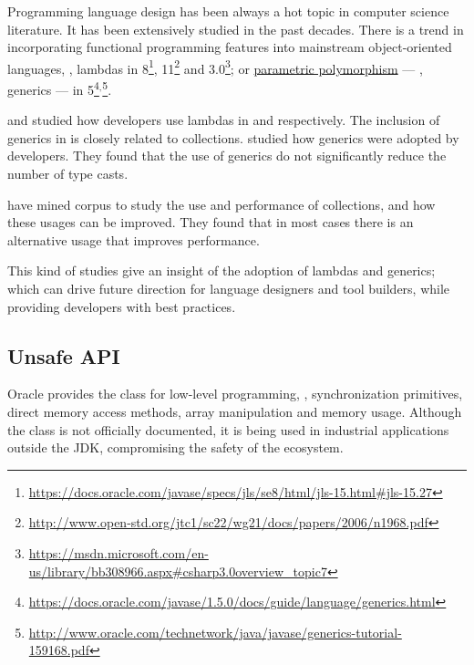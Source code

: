Programming language design has been always a hot topic in computer science literature.
It has been extensively studied in the past decades.
There is a trend in incorporating functional programming features into mainstream object-oriented languages, \eg,
lambdas in \java{} 8\footnote{\url{https://docs.oracle.com/javase/specs/jls/se8/html/jls-15.html\#jls-15.27}},
\cpp{}11\footnote{\url{http://www.open-std.org/jtc1/sc22/wg21/docs/papers/2006/n1968.pdf}} and
\cs{} 3.0\footnote{\url{https://msdn.microsoft.com/en-us/library/bb308966.aspx\#csharp3.0overview\_topic7}};
or \underline{parametric polymorphism}   --- \ie{}, generics --- in \java{} 5\footnote{\url{https://docs.oracle.com/javase/1.5.0/docs/guide/language/generics.html}}\(^{,}\)\footnote{\url{http://www.oracle.com/technetwork/java/javase/generics-tutorial-159168.pdf}}.

\cite{mazinanianUnderstandingUseLambda2017} and \cite{uesbeckEmpiricalStudyImpact2016} studied how developers use lambdas in \java{} and \cpp{} respectively.
The inclusion of generics in \java{} is closely related to collections. 
\cite{parninJavaGenericsAdoption2011,parninAdoptionUseJava2013} studied how generics were adopted by \java{} developers.
They found that the use of generics do not significantly reduce the number of type casts.

\cite{costaEmpiricalStudyUsage2017} have mined \github{} corpus to study the use and performance of collections,
and how these usages can be improved.
They found that in most cases there is an alternative usage that
improves performance.

This kind of studies give an insight of the adoption of lambdas and generics; which can drive future direction for language designers and tool builders, while providing developers with best practices.

\subsection*{Unsafe API}
\label{sec:lr:unsafe}

Oracle provides the \smu{} class for low-level programming,
\eg, synchronization primitives, direct memory access methods,
array manipulation and memory usage.
Although the \smu{} class is not officially documented,
it is being used in industrial applications outside the JDK, compromising the safety of the \java{} ecosystem.

